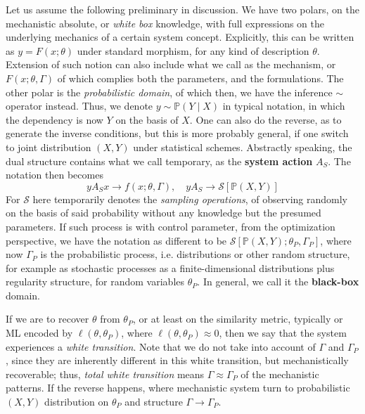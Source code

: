 Let us assume the following preliminary in discussion. We have two polars, on the mechanistic absolute, or \textit{white box} knowledge, with full expressions on the underlying mechanics of a certain system concept. Explicitly, this can be written as $y=F(x;\theta)$ under standard morphism, for any kind of description $\theta$. Extension of such notion can also include what we call as the mechanism, or $F(x;\theta,\Gamma)$ of which complies both the parameters, and the formulations. The other polar is the \textit{probabilistic domain}, of which then, we have the inference $\sim$ operator instead. Thus, we denote $y\sim \mathbb{P}(Y\mid X)$ in typical notation, in which the dependency is now $Y$ on the basis of $X$. One can also do the reverse, as to generate the inverse conditions, but this is more probably general, if one switch to joint distribution $(X,Y)$ under statistical schemes. Abstractly speaking, the dual structure contains what we call temporary, as the \textbf{system action} $A_{S}$. The notation then becomes 
\begin{equation}
    yA_{S}x \to f(x;\theta,\Gamma), \quad yA_{S}\to \mathcal{S}[\mathbb{P}(X,Y)]
\end{equation}
For $\mathcal{S}$ here temporarily denotes the \textit{sampling operations}, of observing randomly on the basis of said probability without any knowledge but the presumed parameters. If such process is with control parameter, from the optimization perspective, we have the notation as different to be $\mathcal{S}[\mathbb{P}(X,Y);\theta_{P},\Gamma_{P}]$, where now $\Gamma_{P}$ is the probabilistic process, i.e. distributions or other random structure, for example as stochastic processes as a finite-dimensional distributions plus regularity structure, for random variables $\theta_{P}$. In general, we call it the \textbf{black-box} domain. 

If we are to recover $\theta$ from $\theta_{P}$, or at least on the similarity metric, typically or ML encoded by $\ell(\theta,\theta_{P})$, where $\ell(\theta,\theta_{P})\approx 0$, then we say that the system experiences a \textit{white transition}. Note that we do not take into account of $\Gamma$ and $\Gamma_{P}$, since they are inherently different in this white transition, but mechanistically recoverable; thus, \textit{total white transition} means $\Gamma \approx \Gamma_{P}$ of the mechanistic patterns. If the reverse happens, where mechanistic system turn to probabilistic $(X,Y)$ distribution on $\theta_{P}$ and structure $\Gamma\to\Gamma_{P}$. 

